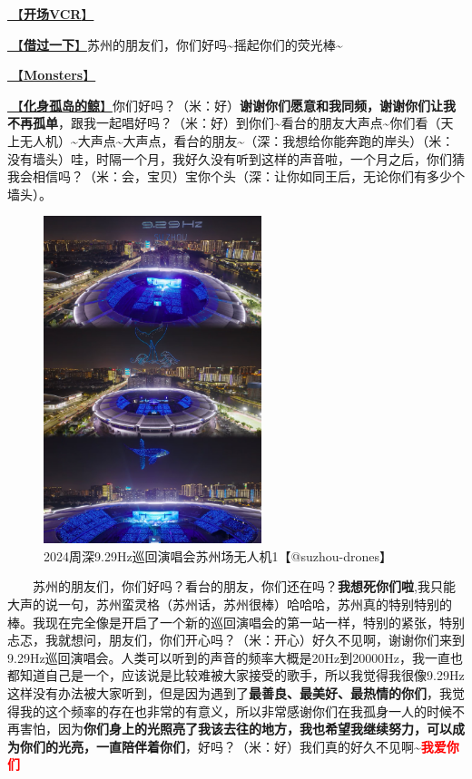 \documentclass[]{ctexbook}
\begin{document}
\hyperref[opening-vcr]{🎥【\textbf{开场VCR}】}

\hyperref[I-will-go-my-way]{🎵【\textbf{借过一下}】}苏州的朋友们，你们好吗\textasciitilde 摇起你们的荧光棒\textasciitilde{}

\hyperref[Monsters]{🎵【\textbf{Monsters}】}

\hyperref[hua-shen-gu-dao-de-jing]{🎵【\textbf{化身孤岛的鲸}】}你们好吗？（米：好）\textbf{谢谢你们愿意和我同频，谢谢你们让我不再孤单}，跟我一起唱好吗？（米：好）到你们\textasciitilde 看台的朋友大声点\textasciitilde 你们看（天上无人机）\textasciitilde 大声点\textasciitilde 大声点，看台的朋友\textasciitilde（深：我想给你能奔跑的岸头）（米：没有墙头）哇，时隔一个月，我好久没有听到这样的声音啦，一个月之后，你们猜我会相信吗？（米：会，宝贝）宝你个头（深：让你如同王后，无论你们有多少个墙头）。

\begin{figure}

{\centering \includegraphics[width=180pt]{img/suzhou20241109/001} 

}

\caption{2024周深9.29Hz巡回演唱会苏州场无人机1【@suzhou-drones】}\label{fig:unnamed-chunk-106}
\end{figure}

  苏州的朋友们，你们好吗？看台的朋友，你们还在吗？\textbf{我想死你们啦},我只能大声的说一句，苏州蛮灵格（苏州话，苏州很棒）哈哈哈，苏州真的特别特别的棒。我现在完全像是开启了一个新的巡回演唱会的第一站一样，特别的紧张，特别忐忑，我就想问，朋友们，你们开心吗？（米：开心）好久不见啊，谢谢你们来到9.29Hz巡回演唱会。人类可以听到的声音的频率大概是20Hz到20000Hz，我一直也都知道自己是一个，应该说是比较难被大家接受的歌手，所以我觉得我很像9.29Hz这样没有办法被大家听到，但是因为遇到了\textbf{最善良、最美好、最热情的你们}，我觉得我的这个频率的存在也非常的有意义，所以非常感谢你们在我孤身一人的时候不再害怕，因为\textbf{你们身上的光照亮了我该去往的地方，我也希望我继续努力，可以成为你们的光亮，一直陪伴着你们}，好吗？（米：好）我们真的好久不见啊\textasciitilde{}\textbf{\textcolor{red}{我爱你们~} }
\end{document}
